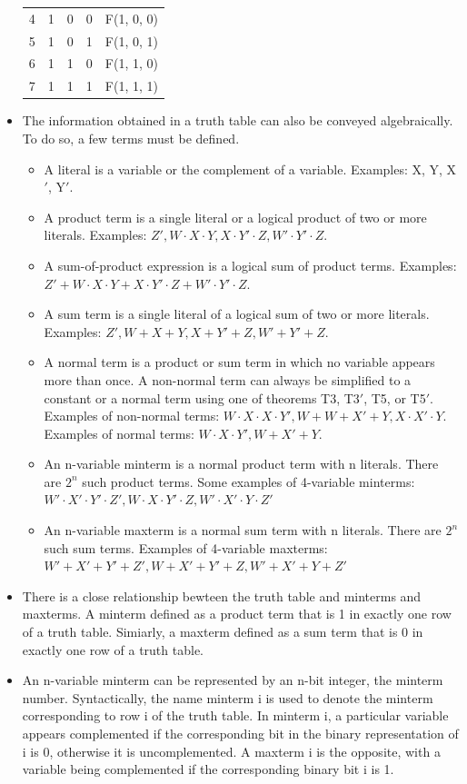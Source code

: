 \documentclass[10pt,a4paper]{article}
\begin{document}
\begin{itemize}
\begin{tabular}{|ccccc|}
4 & 1 & 0 & 0 & F(1, 0, 0) \\ 
5 & 1 & 0 & 1 & F(1, 0, 1) \\ 
6 & 1 & 1 & 0 & F(1, 1, 0) \\ 
7 & 1 & 1 & 1 & F(1, 1, 1) \\ 
\hline 
\end{tabular} 
\item The information obtained in a truth table can also be conveyed algebraically. To do so, a few terms must be defined.
\begin{itemize}
\item A literal is a variable or the complement of a variable. Examples: X, Y, X$'$, Y$'$. 
\item A product term is a single literal or a logical product of two or more literals. Examples: $Z', W\cdot X\cdot Y, X\cdot Y'\cdot Z, W'\cdot Y'\cdot Z$.
\item A sum-of-product expression is a logical sum of product terms. Examples: $Z'+W\cdot X\cdot Y+X\cdot Y'\cdot Z+W'\cdot Y'\cdot Z$.
\item A sum term is a single literal of a logical sum of two or more literals. Examples: $Z', W+X+Y, X+Y'+Z, W'+Y'+Z$.
\pagebreak
\item A normal term is a product or sum term in which no variable appears more than once. A non-normal term can always be simplified to a constant or a normal term using one of theorems T3, T3$'$, T5, or T5$'$. Examples of non-normal terms: $W\cdot X\cdot X\cdot Y', W+W+X'+Y, X\cdot X'\cdot Y$. Examples of normal terms: $W\cdot X\cdot Y', W+X'+Y$.
\item An n-variable minterm is a normal product term with n literals. There are $2^n$ such product terms. Some examples of 4-variable minterms: $W'\cdot X'\cdot Y'\cdot Z', W\cdot X\cdot Y'\cdot Z, W'\cdot X'\cdot Y\cdot Z'$
\item An n-variable maxterm is a normal sum term with n literals. There are $2^n$ such sum terms. Examples of 4-variable maxterms: $W'+X'+Y'+Z', W+X'+Y'+Z, W'+X'+Y+Z'$
\end{itemize}
\item There is a close relationship bewteen the truth table and minterms and maxterms. A minterm defined as a product term that is 1 in exactly one row of a truth table. Simiarly, a maxterm defined as a sum term that is 0 in exactly one row of a truth table. 
\item An n-variable minterm can be represented by an n-bit integer, the minterm number. Syntactically, the name minterm i is used to denote the minterm corresponding to row i of the truth table. In minterm i, a particular variable appears complemented if the corresponding bit in the binary representation of i is 0, otherwise it is uncomplemented. A maxterm i is the opposite, with a variable being complemented if the corresponding binary bit i is 1. 

\end{itemize}
\end{document}
